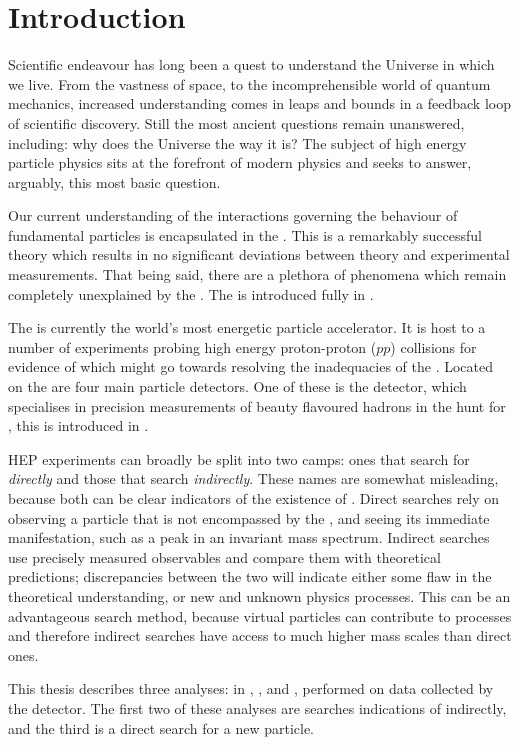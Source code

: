 \chapter{Introduction}
\label{ch:intro}

Scientific endeavour has long been a quest to understand the Universe in which we live.
From the vastness of space, to the incomprehensible world of quantum mechanics,
increased understanding comes in leaps and bounds in a feedback loop of scientific discovery.
Still the most ancient questions remain unanswered, including: why does the Universe the way it is?
The subject of high energy particle physics sits at the forefront of modern physics and seeks to
answer, arguably, this most basic question.

Our current understanding of the interactions governing the behaviour of fundamental particles is
encapsulated in the \sm.
This is a remarkably successful theory which results in no significant deviations between theory
and experimental measurements.
That being said, there are a plethora of phenomena which remain completely unexplained by the \sm.
The \sm is introduced fully in .

The \lhc is currently the world's most energetic particle accelerator.
It is host to a number of
experiments probing high energy proton-proton ($pp$) collisions for evidence of \np
which might go towards resolving the inadequacies of the \sm.
Located on the \lhc are four main particle detectors.
One of these is the \lhcb detector, which
specialises in precision measurements of beauty flavoured hadrons in the hunt for \np, this is
introduced in .

\gls{HEP} experiments can broadly be split into two camps: ones that search for \np
\emph{directly} and those that search \emph{indirectly}.
These names are somewhat misleading, because both can be clear indicators of the existence of
\np.
Direct searches rely on observing a particle that is not encompassed by the \sm,
and seeing its immediate manifestation, such as a peak in an invariant mass spectrum.
Indirect searches
use precisely measured observables and compare them with theoretical predictions; discrepancies
between the two will indicate either some flaw in the theoretical understanding, or new and unknown
physics processes.
This can be an advantageous search method, because virtual particles can contribute to processes
and therefore indirect searches have access to much higher mass scales than direct ones.

This thesis describes three analyses: in , , and ,
performed on data collected by the \lhcb detector.
The first two of these analyses are searches indications of \np indirectly, and the third is a
direct search for a new particle.


\clearpage
